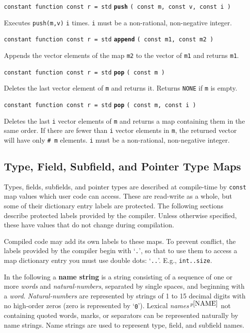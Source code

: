 \documentclass[12pt]{article}
\newcommand{\key}[1]{{\rm \bfseries #1}}
\newcommand{\ttkey}[1]{{\tt \bfseries #1}}
\newcommand{\pagnote}[1]{$\,^{p\pageref{#1}}$}
\newenvironment{indpar}[1][0.3in]%
	{\begin{list}{}%
		     {\setlength{\itemsep}{0in}%
		      \setlength{\topsep}{0in}%
		      \setlength{\parsep}{1ex}%
		      \setlength{\labelwidth}{#1}%
		      \setlength{\leftmargin}{#1}%
		      \addtolength{\leftmargin}{\labelsep}}%
	 \item}%
	{\end{list}}
\begin{document}
{\tt constant function const r = std} \ttkey{push}
    {\tt ( const m, const v, const i )}
\begin{indpar}
Executes {\tt push(m,v)} {\tt i} times.  {\tt i} must be a
non-rational, non-negative integer.
\end{indpar}

{\tt constant function const r = std} \ttkey{append}
    {\tt ( const m1, const m2 )}
\begin{indpar}
Appends the vector elements of the map {\tt m2} to the vector of {\tt m1}
and returns {\tt m1}.
\end{indpar}

{\tt constant function const r = std} \ttkey{pop} {\tt ( const m )}
\begin{indpar}
Deletes the last vector element of {\tt m} and returns it.
Returns {\tt NONE} if {\tt m} is empty.
\end{indpar}

{\tt constant function const r = std} \ttkey{pop} {\tt ( const m, const i )}
\begin{indpar}
Deletes the last {\tt i} vector elements of {\tt m} and returns a map
containing them in the same order.
If there are fewer than {\tt i} vector elements
in {\tt m}, the returned vector will have only {\tt \# m} elements.
{\tt i} must be a non-rational, non-negative integer.
\end{indpar}

\subsection{Type, Field, Subfield, and Pointer Type Maps}
\label{TYPE-FIELD-SUBFIELD-MAPS}

Types, fields, subfields, and pointer types are described
at compile-time by {\tt const} map values which
user code can access.
These are read-write as a whole, but some of their dictionary entry
labels are protected.  The following sections describe protected labels
provided by the compiler.  Unless otherwise specified,
these have values that do not change during compilation.

Compiled code may add its own labels to these maps.
To prevent conflict, the labels provided by the compiler
begin with `{\tt .}', so
that to use them to access a map dictionary entry
you must use double dots: `{\tt ..}'.
E.g., {\tt int..size}.

In the following a \key{name string} is a string
consisting of a sequence of one or more {\em words}
and {\em natural-numbers}, separated
by single spaces, and beginning with a {\em word}.
{\em Natural-numbers} are represented
by strings of 1 to 15 decimal digits with no high-order
zeros (zero is represented by `{\tt 0}').
Lexical {\em names}\pagnote{NAME} not containing quoted words, marks, or
separators can be represented naturally by name strings.
Name strings are used to represent type, field, and subfield
names.
\end{document}
